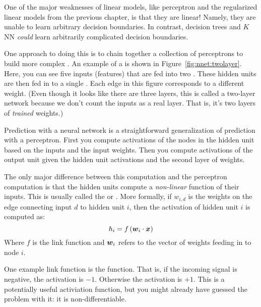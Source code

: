 One of the major weaknesses of linear models, like perceptron and the
regularized linear models from the previous chapter, is that they are
linear!  Namely, they are unable to learn arbitrary decision
boundaries.  In contrast, decision trees and $K$NN \emph{could} learn
arbitrarily complicated decision boundaries.


One approach to doing this is to chain together a collection of
perceptrons to build more complex .  An
example of a  is shown in
Figure~\ref{fig:nnet:twolayer}.  Here, you can see five inputs
(features) that are fed into two .  These hidden
units are then fed in to a single .  Each edge in
this figure corresponds to a different weight.  (Even though it looks
like there are three layers, this is called a two-layer network
because we don't count the inputs as a real layer.  That is, it's two
layers of \emph{trained} weights.)

Prediction with a neural network is a straightforward generalization
of prediction with a perceptron.  First you compute activations of the
nodes in the hidden unit based on the inputs and the input weights.
Then you compute activations of the output unit given the hidden unit
activations and the second layer of weights.

The only major difference between this computation and the perceptron
computation is that the hidden units compute a \emph{non-linear}
function of their inputs.  This is usually called the
 or .  More
formally, if $w_{i,d}$ is the weights on the edge connecting input $d$
to hidden unit $i$, then the activation of hidden unit $i$ is computed
as:
%
\begin{equation}
  h_i = f\left( {\boldsymbol{w}}_i \cdot {\boldsymbol{x}} \right)
\end{equation}
%
Where $f$ is the link function and ${\boldsymbol{w}}_i$ refers to the
vector of weights feeding in to node $i$.

One example link function is the  function.  That is, if
the incoming signal is negative, the activation is $-1$.  Otherwise
the activation is $+1$.  This is a potentially useful activiation
function, but you might already have guessed the problem with it: it
is non-differentiable.


